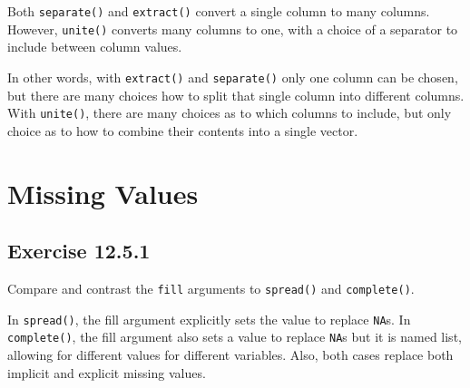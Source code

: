 \documentclass[]{book}
\newenvironment{Shaded}{\begin{snugshade}}{\end{snugshade}}
\newcommand{\CommentTok}[1]{\textcolor[rgb]{0.56,0.35,0.01}{\textit{#1}}}
\newcommand{\DataTypeTok}[1]{\textcolor[rgb]{0.13,0.29,0.53}{#1}}
\newcommand{\DecValTok}[1]{\textcolor[rgb]{0.00,0.00,0.81}{#1}}
\newcommand{\KeywordTok}[1]{\textcolor[rgb]{0.13,0.29,0.53}{\textbf{#1}}}
\newcommand{\NormalTok}[1]{#1}
\newcommand{\OperatorTok}[1]{\textcolor[rgb]{0.81,0.36,0.00}{\textbf{#1}}}
\newcommand{\StringTok}[1]{\textcolor[rgb]{0.31,0.60,0.02}{#1}}
\theoremstyle{plain}
\theoremstyle{remark}
\theoremstyle{definition}
\theoremstyle{definition}
\theoremstyle{definition}
\theoremstyle{remark}
\begin{document}
Both \texttt{separate()} and \texttt{extract()} convert a single column
to many columns. However, \texttt{unite()} converts many columns to one,
with a choice of a separator to include between column values.

\begin{Shaded}
\end{Shaded}

In other words, with \texttt{extract()} and \texttt{separate()} only one
column can be chosen, but there are many choices how to split that
single column into different columns. With \texttt{unite()}, there are
many choices as to which columns to include, but only choice as to how
to combine their contents into a single vector.

\hypertarget{missing-values-1}{%
\section{Missing Values}\label{missing-values-1}}

\hypertarget{exercise-12.5.1}{%
\subsection*{\texorpdfstring{Exercise
{12.5.1}}{Exercise 12.5.1}}\label{exercise-12.5.1}}

Compare and contrast the \texttt{fill} arguments to \texttt{spread()}
and \texttt{complete()}.

In \texttt{spread()}, the fill argument explicitly sets the value to
replace \texttt{NA}s. In \texttt{complete()}, the fill argument also
sets a value to replace \texttt{NA}s but it is named list, allowing for
different values for different variables. Also, both cases replace both
implicit and explicit missing values.
\end{document}
